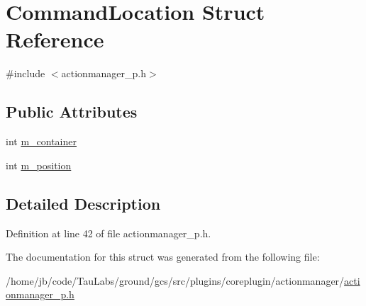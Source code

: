 \hypertarget{struct_command_location}{\section{\-Command\-Location \-Struct \-Reference}
\label{struct_command_location}
}


{\ttfamily \#include $<$actionmanager\-\_\-p.\-h$>$}

\subsection*{\-Public \-Attributes}
\begin{DoxyCompactItemize}
\item 
int \hyperlink{group___core_plugin_ga77fd2ba8f58cd1fb57c0ed468bd2791d}{m\-\_\-container}
\item 
int \hyperlink{group___core_plugin_gac64dc48172acb67e87bb6a0ae5f4aeb5}{m\-\_\-position}
\end{DoxyCompactItemize}


\subsection{\-Detailed \-Description}


\-Definition at line 42 of file actionmanager\-\_\-p.\-h.



\-The documentation for this struct was generated from the following file\-:\begin{DoxyCompactItemize}
\item 
/home/jb/code/\-Tau\-Labs/ground/gcs/src/plugins/coreplugin/actionmanager/\hyperlink{actionmanager__p_8h}{actionmanager\-\_\-p.\-h}\end{DoxyCompactItemize}
